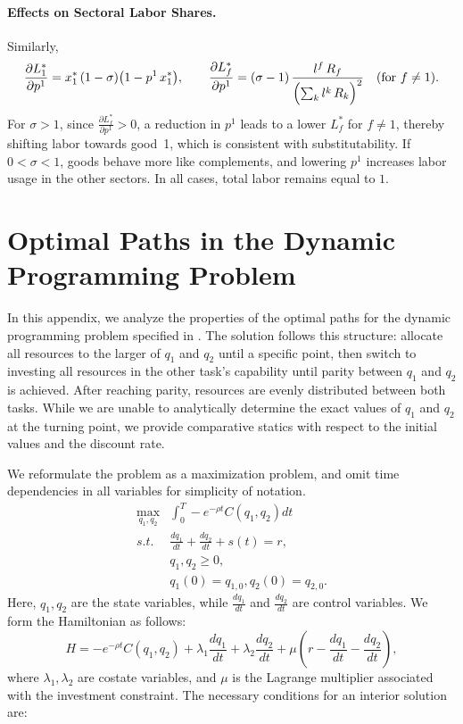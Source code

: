 \documentclass{article}
\theoremstyle{plain}
\theoremstyle{plain}
\begin{document}
\paragraph{Effects on Sectoral Labor Shares.}
Similarly, 
\[
\frac{\partial L_{1}^*}{\partial p^1}
=
x_{1}^*\,(1-\sigma)\bigl(1 - p^1\,x_{1}^*\bigr),
\qquad
\frac{\partial L_{f}^*}{\partial p^1}
=
(\sigma-1)\,
\frac{\,l_{}^f\, R_{f}\,}{\Bigl(\sum_{k} l_{}^k\, R_{k}\Bigr)^{2}}
\quad (\text{for } f\neq 1).
\]
For $\sigma>1$, since $\frac{\partial L_{f}^*}{\partial p^1}>0$, a reduction in $p^1$ leads to a lower $L_f^*$ for $f\neq 1$, thereby shifting labor towards good~1, which is consistent with substitutability.  
If $0<\sigma<1$, goods behave more like complements, and lowering $p^1$ increases labor usage in the other sectors.  
In all cases, total labor remains equal to $1$.


\section{Optimal Paths in the Dynamic Programming Problem}
\label{app:dp_proof}

In this appendix, we analyze the properties of the optimal paths for the dynamic programming problem specified in \pageref{eq:dp_problem}.
The solution follows this structure: allocate all resources to the larger of $q_{1}$ and $q_{2}$ until a specific point, then switch to investing all resources in the other task’s capability until parity between $q_{1}$ and $q_{2}$ is achieved. 
After reaching parity, resources are evenly distributed between both tasks. 
While we are unable to analytically determine the exact values of $q_{1}$ and $q_{2}$ at the turning point, we provide comparative statics with respect to the initial values and the discount rate.

We reformulate the problem as a maximization problem, and omit time dependencies in all variables for simplicity of notation.
\begin{align*}
\max_{q_{1},q_{2}} & \int_{0}^{T}-e^{-\rho t}C(q_{1},q_{2})dt\\
s.t. & \frac{dq_{1}}{dt}+\frac{dq_{2}}{dt}+s(t)=r,\\
 & q_{1},q_{2}\geq0,\\
 & q_{1}(0)=q_{1,0},q_{2}(0)=q_{2,0}.
\end{align*}
Here, $q_{1},q_{2}$ are the state variables, while $\frac{dq_{1}}{dt}$ and $\frac{dq_{2}}{dt}$ are control variables. 
We form the Hamiltonian as follows: 
\[
H=-e^{-\rho t}C(q_{1},q_{2})+\lambda_{1}\frac{dq_{1}}{dt}+\lambda_{2}\frac{dq_{2}}{dt}+\mu\left(r-\frac{dq_{1}}{dt}-\frac{dq_{2}}{dt}\right),
\]
where $\lambda_{1},\lambda_{2}$ are costate variables, and $\mu$ is the Lagrange multiplier associated with the investment constraint.
The necessary conditions for an interior solution are: %
\end{document}
